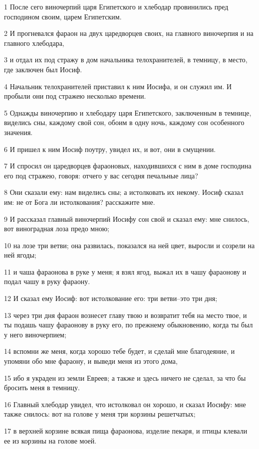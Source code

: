 \par 1 После сего виночерпий царя Египетского и хлебодар провинились пред господином своим, царем Египетским.
\par 2 И прогневался фараон на двух царедворцев своих, на главного виночерпия и на главного хлебодара,
\par 3 и отдал их под стражу в дом начальника телохранителей, в темницу, в место, где заключен был Иосиф.
\par 4 Начальник телохранителей приставил к ним Иосифа, и он служил им. И пробыли они под стражею несколько времени.
\par 5 Однажды виночерпию и хлебодару царя Египетского, заключенным в темнице, виделись сны, каждому свой сон, обоим в одну ночь, каждому сон особенного значения.
\par 6 И пришел к ним Иосиф поутру, увидел их, и вот, они в смущении.
\par 7 И спросил он царедворцев фараоновых, находившихся с ним в доме господина его под стражею, говоря: отчего у вас сегодня печальные лица?
\par 8 Они сказали ему: нам виделись сны; а истолковать их некому. Иосиф сказал им: не от Бога ли истолкования? расскажите мне.
\par 9 И рассказал главный виночерпий Иосифу сон свой и сказал ему: мне снилось, вот виноградная лоза предо мною;
\par 10 на лозе три ветви; она развилась, показался на ней цвет, выросли и созрели на ней ягоды;
\par 11 и чаша фараонова в руке у меня; я взял ягод, выжал их в чашу фараонову и подал чашу в руку фараону.
\par 12 И сказал ему Иосиф: вот истолкование его: три ветви--это три дня;
\par 13 через три дня фараон вознесет главу твою и возвратит тебя на место твое, и ты подашь чашу фараонову в руку его, по прежнему обыкновению, когда ты был у него виночерпием;
\par 14 вспомни же меня, когда хорошо тебе будет, и сделай мне благодеяние, и упомяни обо мне фараону, и выведи меня из этого дома,
\par 15 ибо я украден из земли Евреев; а также и здесь ничего не сделал, за что бы бросить меня в темницу.
\par 16 Главный хлебодар увидел, что истолковал он хорошо, и сказал Иосифу: мне также снилось: вот на голове у меня три корзины решетчатых;
\par 17 в верхней корзине всякая пища фараонова, изделие пекаря, и птицы клевали ее из корзины на голове моей.

